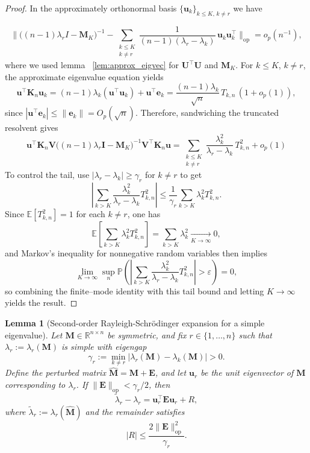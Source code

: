 \documentclass[11pt]{article}
\theoremstyle{plain}
\newtheorem{lemma}[theorem]{Lemma}
\theoremstyle{remark}
\newcommand{\op}{\mathrm{op}}
\begin{document}
\begin{proof}
In the approximately orthonormal basis $\{\mathbf u_k\}_{k\le K,\,k\neq r}$ we have

\[
\Big\|
\bigl((n-1)\lambda_r I-\mathbf M_K\bigr)^{-1}
-
\sum_{\substack{k\le K\\ k\neq r}}
\frac{1}{(n-1)(\lambda_r-\lambda_k)}\,\mathbf u_k\mathbf u_k^\top
\Big\|_{\op}
=o_p(n^{-1}),
\]
where we used lemma ~\ref{lem:approx_eigvec} for $\mathbf U^\top\mathbf U$ and $\mathbf{M}_K$.
For $k\le K$, $k\neq r$, the approximate eigenvalue equation yields
\[
\mathbf u^\top\mathbf K_n\mathbf u_k
=
(n-1)\lambda_k(\mathbf u^\top\mathbf u_k)+\mathbf u^\top\mathbf e_k
=
\frac{(n-1)\lambda_k}{\sqrt n}\,T_{k,n}\,(1+o_p(1)),
\]
since $|\mathbf u^\top\mathbf e_k|\le \|\mathbf e_k\|=O_p(\sqrt n)$. Therefore, sandwiching the truncated resolvent gives
\[
\mathbf u^\top\mathbf K_n\mathbf V\bigl((n-1)\lambda_r\mathbf I-\mathbf M_K\bigr)^{-1}\mathbf V^\top\mathbf K_n\mathbf u
=
\sum_{\substack{k\le K\\ k\neq r}}
\frac{\lambda_k^2}{\lambda_r-\lambda_k}\,T_{k,n}^2
+ o_p(1)
\]
To control the tail, use $|\lambda_r-\lambda_k|\ge \gamma_r$ for $k\neq r$ to get
\[
\left|\sum_{k>K}\frac{\lambda_k^2}{\lambda_r-\lambda_k}T_{k,n}^2\right|
\le \frac{1}{\gamma_r}\sum_{k>K}\lambda_k^2T_{k,n}^2.
\]
Since $\mathbb{E}[T_{k,n}^2]=1$ for each $k\neq r$, one has
\[
\mathbb{E}\!\left[\sum_{k>K}\lambda_k^2T_{k,n}^2\right]
=
\sum_{k>K}\lambda_k^2
\xrightarrow[K\to\infty]{}0,
\]
and Markov's inequality for nonnegative random variables then implies
\[
\lim_{K\to\infty}\sup_n\mathbb{P}\!\left(\left|\sum_{k>K}\frac{\lambda_k^2}{\lambda_r-\lambda_k}T_{k,n}^2\right|>\varepsilon\right)=0,
\]
so combining the finite–mode identity with this tail bound and letting $K\to\infty$ yields the result.
\end{proof}

\begin{lemma}[Second-order Rayleigh-Schrödinger expansion for a simple eigenvalue]
\label{lem:expansion}
Let $\mathbf{M} \in \mathbb{R}^{n \times n}$ be symmetric, and fix $r \in \{1,\dots,n\}$ such that 
$\lambda_r := \lambda_r(\mathbf{M})$ is simple with eigengap
\[
\gamma_r := \min_{k \neq r}|\lambda_r(\mathbf{M}) - \lambda_k(\mathbf{M})| > 0.
\]
Define the perturbed matrix $\widehat{\mathbf{M}} = \mathbf{M} + \mathbf{E}$, and let $\mathbf{u}_r$
be the unit eigenvector of $\mathbf{M}$ corresponding to $\lambda_r$.
If $\|\mathbf{E}\|_{\op} < \gamma_r/2$, then
\[
\widetilde{\lambda}_r - \lambda_r
=
\mathbf{u}_r^\top \mathbf{E}\mathbf{u}_r + R,
\]
where $\widetilde{\lambda}_r := \lambda_r(\widehat{\mathbf{M}})$ and the remainder satisfies
\[
|R| \le \frac{2\|\mathbf{E}\|_{\op}^2}{\gamma_r}.
\]
\end{lemma}
\end{document}
